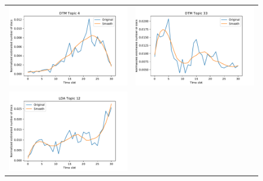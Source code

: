 \documentclass[a4paper]{report}
\begin{document}
\begin{figure}[h!]
\begin{center}
\begin{tabular}{cc}
\includegraphics[scale=.5]{DTMpopulationTopic4.pdf} &
\includegraphics[scale=.5]{DTMpopulationTopic33.pdf} \\
\includegraphics[scale=.5]{LDApopulationTopic12.pdf} &

\end{tabular}
\end{center}
\end{figure}
\end{document}
